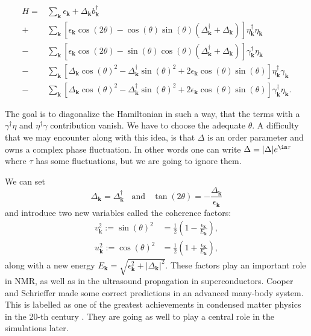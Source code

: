 \documentclass[../main.tex]{subfile}
\begin{document}
\begin{equation}
    \begin{aligned}
        H =& \sum_{\bm{k}} \epsilon_{\bm{k}} + \Delta_{\bm{k}}b_{\bm{k}}^{\dagger}\\
          +& \sum_{\bm{k}} \left[\epsilon_{\bm{k}}\cos(2\theta) - \cos(\theta)\sin(\theta)\left(\Delta_{\bm{k}}^{\dagger}+ \Delta_{\bm{k}}\right)\right] \eta_{\bm{k}}^{\dagger}\eta_{\bm{k}}\\
          -& \sum_{\bm{k}} \left[\epsilon_{\bm{k}}\cos(2\theta) -\sin(\theta)\cos(\theta)\left(\Delta_{\bm{k}}^{\dagger}+ \Delta_{\bm{k}}\right)\right]\gamma^{\dagger}_{\bm{k}}\eta_{\bm{k}}\\
          -& \sum_{\bm{k}} \left[\Delta_{\bm{k}} \cos(\theta)^2 - \Delta_{\bm{k}}^{\dagger}\sin(\theta)^2 + 2\epsilon_{\bm{k}} \cos(\theta)\sin(\theta) \right]\eta^{\dagger}_{\bm{k}}\gamma_{\bm{k}}\\
          -& \sum_{\bm{k}} \left[\Delta_{\bm{k}} \cos(\theta)^2 - \Delta_{\bm{k}}^{\dagger}\sin(\theta)^2 + 2\epsilon_{\bm{k}} \cos(\theta)\sin(\theta) \right]\gamma^{\dagger}_{\bm{k}}\eta_{\bm{k}}.     
    \end{aligned}
\end{equation}

The goal is to diagonalize the Hamiltonian in such a way, that the terms with a $\gamma^{\dagger}\eta$ and $\eta^{\dagger}\gamma$ contribution vanish. We have to choose the adequate $\theta$.
A difficulty that we may encounter along with this idea, is that $\Delta$ is an order parameter and owns a complex phase fluctuation. In other words one can write
$\Delta = |\Delta|e^{\im\tau}$ where $\tau$ has some fluctuations, but we are going to ignore them.

We can set
\begin{equation*}
    \Delta_{\bm{k}} = \Delta_{\bm{k}}^{\dagger}~~~~ \text{and} ~~~~ \tan(2\theta) = -\frac{\Delta_{\bm{k}}}{\epsilon_{\bm{k}}}
\end{equation*}
and introduce two new variables called the coherence factors:
\begin{align}
    v_{\bm{k}}^2 := \sin(\theta)^2 &= \frac{1}{2} \left(1 - \frac{\epsilon_{\bm{k}}}{E_{\bm{k}}}\right), \label{eq:coherenceFac_v}\\
    u_{\bm{k}}^2 := \cos(\theta)^2 &= \frac{1}{2} \left(1 + \frac{\epsilon_{\bm{k}}}{E_{\bm{k}}}\right)  \label{eq:coherenceFac_u},
\end{align}
along with a new energy $E_{\bm{k}} = \sqrt{\epsilon_{\bm{k}}^2 + |\Delta_{\bm{k}}|^2}$. These factors play an important
role in NMR, as well as in the ultrasound propagation in superconductors. Cooper and Schrieffer made some correct
predictions in an advanced many-body system. This is labelled as one of the greatest achievements in condensed matter physics in the 20-th century \cite{FossheimSudbo2004}.
They are going as well to play a central role in the simulations later.\\
\end{document}
